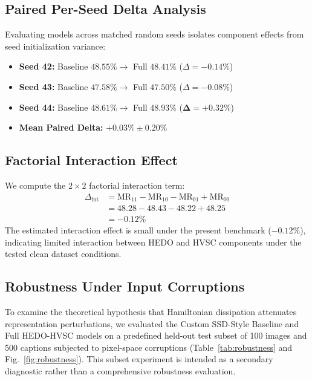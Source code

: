 \documentclass[pdflatex,sn-mathphys-num]{sn-jnl}%
\begin{document}
\subsection{Paired Per-Seed Delta Analysis}
Evaluating models across matched random seeds isolates component effects from seed initialization variance:
\begin{itemize}
    \item \textbf{Seed 42:} Baseline $48.55\% \rightarrow$ Full $48.41\%$ ($\Delta = -0.14\%$)
    \item \textbf{Seed 43:} Baseline $47.58\% \rightarrow$ Full $47.50\%$ ($\Delta = -0.08\%$)
    \item \textbf{Seed 44:} Baseline $48.61\% \rightarrow$ Full $48.93\%$ ($\mathbf{\Delta = +0.32\%}$)
    \item \textbf{Mean Paired Delta:} $\mathbf{+0.03\% \pm 0.20\%}$
\end{itemize}

\subsection{Factorial Interaction Effect}
We compute the $2 \times 2$ factorial interaction term:
\begin{equation}
\begin{aligned}
\Delta_{\text{int}} &= \text{MR}_{11} - \text{MR}_{10} - \text{MR}_{01} + \text{MR}_{00} \\
&= 48.28 - 48.43 - 48.22 + 48.25 \\
&= -0.12\%
\end{aligned}
\end{equation}
The estimated interaction effect is small under the present benchmark ($-0.12\%$), indicating limited interaction between HEDO and HVSC components under the tested clean dataset conditions.

\subsection{Robustness Under Input Corruptions}
To examine the theoretical hypothesis that Hamiltonian dissipation attenuates representation perturbations, we evaluated the Custom SSD-Style Baseline and Full HEDO-HVSC models on a predefined held-out test subset of 100 images and 500 captions subjected to pixel-space corruptions (Table~\ref{tab:robustness} and Fig.~\ref{fig:robustness}). This subset experiment is intended as a secondary diagnostic rather than a comprehensive robustness evaluation.
\end{document}
